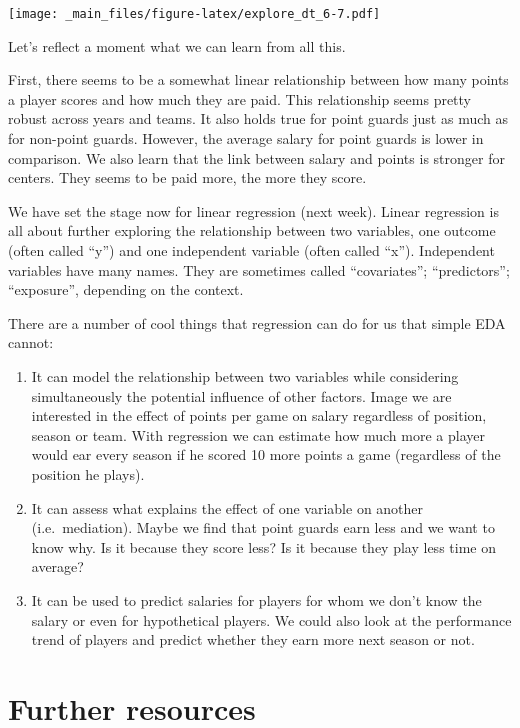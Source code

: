 \documentclass[
]{book}
\begin{document}
\texttt{[image: \_main\_files/figure-latex/explore\_dt\_6-7.pdf]}

Let's reflect a moment what we can learn from all this.

First, there seems to be a somewhat linear relationship between how many points
a player scores and how much they are paid. This relationship seems pretty robust across years and teams. It also holds true for point guards just as much as for non-point guards. However, the average salary for point guards is lower in comparison. We also learn that the link between salary and points is stronger for centers. They seems to be paid more, the more they score.

We have set the stage now for linear regression (next week). Linear regression
is all about further exploring the relationship between two variables, one outcome (often called ``y'') and one independent variable (often called ``x''). Independent variables have many names. They are sometimes called ``covariates''; ``predictors''; ``exposure'', depending on the context.

There are a number of cool things that regression can do for us that simple EDA cannot:

\begin{enumerate}
\def\labelenumi{\arabic{enumi})}
\item
  It can model the relationship between two variables while considering simultaneously the potential influence of other factors. Image we are interested
  in the effect of points per game on salary regardless of position, season or team.
  With regression we can estimate how much more a player would ear every season
  if he scored 10 more points a game (regardless of the position he plays).
\item
  It can assess what explains the effect of one variable on another (i.e.~mediation). Maybe we find that point guards earn less and we want to know why. Is it because they score less? Is it because they play less time on average?
\item
  It can be used to predict salaries for players for whom we don't know the salary or even for hypothetical players. We could also look at the performance trend of players and predict whether they earn more next season or not.
\end{enumerate}

\hypertarget{further-resources}{%
\section{Further resources}\label{further-resources}}
\end{document}
